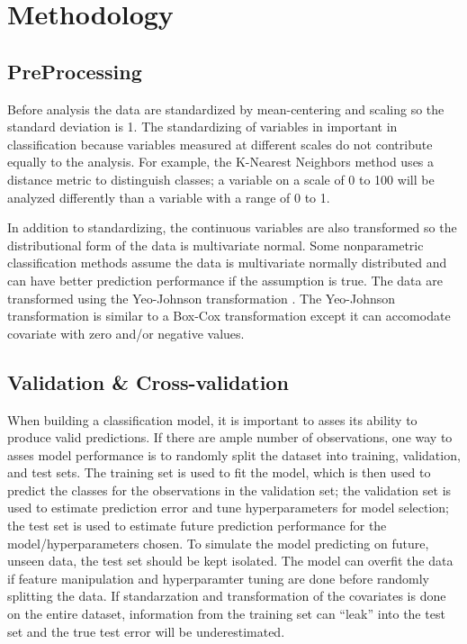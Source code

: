 \documentclass[12pt,]{article}
\begin{document}
\newpage

\section{Methodology}\label{methodology}

\subsection{PreProcessing}\label{preprocessing}

Before analysis the data are standardized by mean-centering and scaling
so the standard deviation is 1. The standardizing of variables in
important in classification because variables measured at different
scales do not contribute equally to the analysis. For example, the
K-Nearest Neighbors method uses a distance metric to distinguish
classes; a variable on a scale of 0 to 100 will be analyzed differently
than a variable with a range of 0 to 1.

In addition to standardizing, the continuous variables are also
transformed so the distributional form of the data is multivariate
normal. Some nonparametric classification methods assume the data is
multivariate normally distributed and can have better prediction
performance if the assumption is true. The data are transformed using
the Yeo-Johnson transformation \autocite{yeo_new_2000}. The Yeo-Johnson
transformation is similar to a Box-Cox transformation except it can
accomodate covariate with zero and/or negative values.

\subsection{Validation \&
Cross-validation}\label{validation-cross-validation}

When building a classification model, it is important to asses its
ability to produce valid predictions. If there are ample number of
observations, one way to asses model performance is to randomly split
the dataset into training, validation, and test sets. The training set
is used to fit the model, which is then used to predict the classes for
the observations in the validation set; the validation set is used to
estimate prediction error and tune hyperparameters for model selection;
the test set is used to estimate future prediction performance for the
model/hyperparameters chosen. To simulate the model predicting on
future, unseen data, the test set should be kept isolated. The model can
overfit the data if feature manipulation and hyperparamter tuning are
done before randomly splitting the data. If standarzation and
transformation of the covariates is done on the entire dataset,
information from the training set can ``leak'' into the test set and the
true test error will be underestimated.
\end{document}
